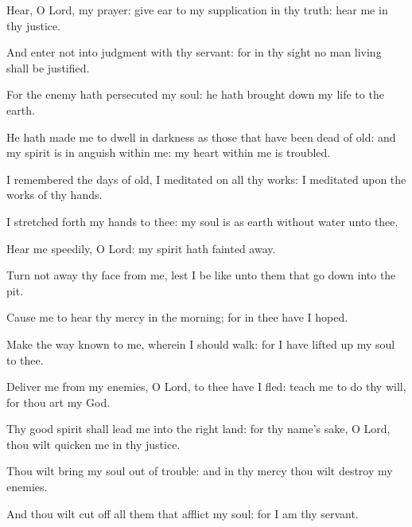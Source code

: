 ﻿\item Hear, O Lord, my prayer: give ear to my supplication in thy truth: hear me in thy justice.
\item And enter not into judgment with thy servant: for in thy sight no man living shall be justified.
\item For the enemy hath persecuted my soul: he hath brought down my life to the earth.
\item He hath made me to dwell in darkness as those that have been dead of old: and my spirit is in anguish within me: my heart within me is troubled.
\item I remembered the days of old, I meditated on all thy works: I meditated upon the works of thy hands.
\item I stretched forth my hands to thee: my soul is as earth without water unto thee. 
\item Hear me speedily, O Lord: my spirit hath fainted away.
\item Turn not away thy face from me, lest I be like unto them that go down into the pit.
\item Cause me to hear thy mercy in the morning; for in thee have I hoped.
\item Make the way known to me, wherein I should walk: for I have lifted up my soul to thee.
\item Deliver me from my enemies, O Lord, to thee have I fled: teach me to do thy will, for thou art my God.
\item Thy good spirit shall lead me into the right land: for thy name’s sake, O Lord, thou wilt quicken me in thy justice.
\item Thou wilt bring my soul out of trouble: and in thy mercy thou wilt destroy my enemies.
\item And thou wilt cut off all them that afflict my soul: for I am thy servant.
